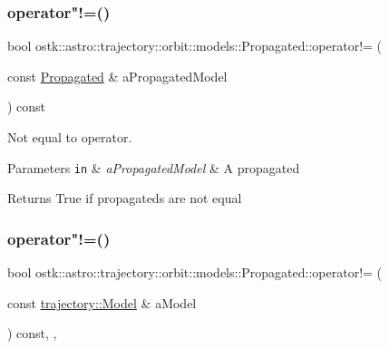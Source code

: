 \subsubsection{\texorpdfstring{operator"!=()}{operator!=()}\hspace{0.1cm}{\footnotesize\ttfamily [1/2]}}
{\footnotesize\ttfamily bool ostk\+::astro\+::trajectory\+::orbit\+::models\+::\+Propagated\+::operator!= (\begin{DoxyParamCaption}\item[{const \hyperlink{classostk_1_1astro_1_1trajectory_1_1orbit_1_1models_1_1_propagated}{Propagated} \&}]{a\+Propagated\+Model }\end{DoxyParamCaption}) const}



Not equal to operator. 


\begin{DoxyParams}[1]{Parameters}
\mbox{\tt in}  & {\em a\+Propagated\+Model} & A propagated \\
\hline
\end{DoxyParams}
\begin{DoxyReturn}{Returns}
True if propagateds are not equal 
\end{DoxyReturn}
\mbox{\label{classostk_1_1astro_1_1trajectory_1_1orbit_1_1models_1_1_propagated_aeffaddcde5540fd1226add8466415d08}} 
\subsubsection{\texorpdfstring{operator"!=()}{operator!=()}\hspace{0.1cm}{\footnotesize\ttfamily [2/2]}}
{\footnotesize\ttfamily bool ostk\+::astro\+::trajectory\+::orbit\+::models\+::\+Propagated\+::operator!= (\begin{DoxyParamCaption}\item[{const \hyperlink{classostk_1_1astro_1_1trajectory_1_1_model}{trajectory\+::\+Model} \&}]{a\+Model }\end{DoxyParamCaption}) const\hspace{0.3cm}{\ttfamily [override]}, {\ttfamily [protected]}, {\ttfamily [virtual]}}



